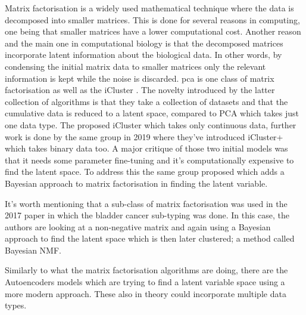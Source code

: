 Matrix factorisation is a widely used mathematical technique where the data is decomposed into smaller matrices. This is done for several reasons in computing, one being that smaller matrices have a lower computational cost. Another reason and the main one in computational biology is that the decomposed matrices incorporate latent information about the biological data. In other words, by condensing the initial matrix data to smaller matrices only the relevant information is kept while the noise is discarded. \acrlong{pca} is one class of matrix factorisation as well as the iCluster \cite{Shen2009-ew, Mo2013-zi, Mo2018-el}. The novelty introduced by the latter collection of algorithms is that they take a collection of datasets and that the cumulative data is reduced to a latent space, compared to PCA which takes just one data type. The \citet{Shen2009-ew} proposed iCluster which takes only continuous data, further work is done by the same group in 2019 \citet{Mo2013-zi} where they've introduced iCluster+ which takes binary data too. A major critique of those two initial models was that it needs some parameter fine-tuning and it's computationally expensive to find the latent space. To address this the same group proposed \citet{Mo2018-el} which adds a Bayesian approach to matrix factorisation in finding the latent variable.

It's worth mentioning that a sub-class of matrix factorisation was used in the 2017 paper \citet{Robertson2017-mg} in which the bladder cancer sub-typing was done. In this case, the authors are looking at a non-negative matrix and again using a Bayesian approach to find the latent space which is then later clustered; a method called Bayesian NMF.

Similarly to what the matrix factorisation algorithms are doing, there are the Autoencoders models which are trying to find a latent variable space using a more modern approach. These also in theory could incorporate multiple data types.

\newpage

